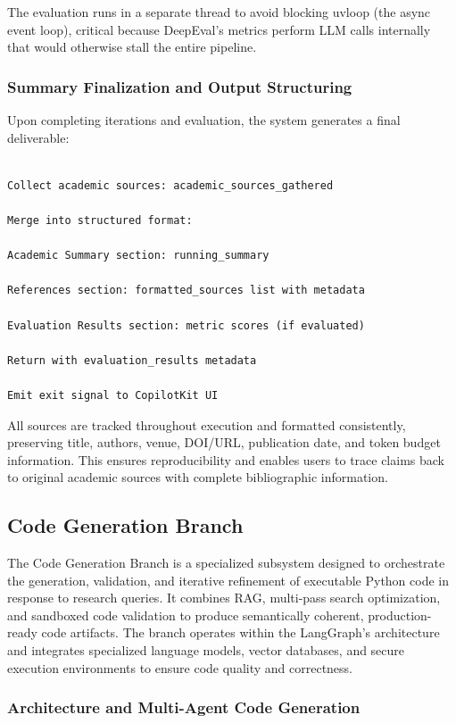 The evaluation runs in a separate thread to avoid blocking uvloop (the async event loop), critical because DeepEval's metrics perform LLM calls internally that would otherwise stall the entire pipeline.

\subsubsection{Summary Finalization and Output Structuring}

Upon completing iterations and evaluation, the system generates a final deliverable:

\begin{lstlisting}

Collect academic sources: academic_sources_gathered

Merge into structured format:

Academic Summary section: running_summary

References section: formatted_sources list with metadata

Evaluation Results section: metric scores (if evaluated)

Return with evaluation_results metadata

Emit exit signal to CopilotKit UI
\end{lstlisting}

All sources are tracked throughout execution and formatted consistently, preserving title, authors, venue, DOI/URL, publication date, and token budget information. This ensures reproducibility and enables users to trace claims back to original academic sources with complete bibliographic information.


\subsection{Code Generation Branch}

The Code Generation Branch is a specialized subsystem designed to orchestrate the generation, validation, and iterative refinement of executable Python code in response to research queries. It combines RAG, multi-pass search optimization, and sandboxed code validation to produce semantically coherent, production-ready code artifacts. The branch operates within the LangGraph's architecture and integrates specialized language models, vector databases, and secure execution environments to ensure code quality and correctness.

\subsubsection{Architecture and Multi-Agent Code Generation}

